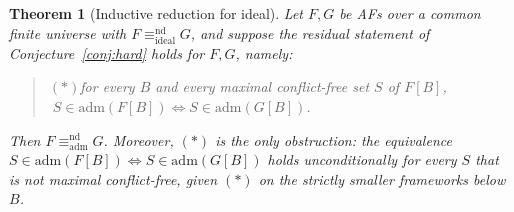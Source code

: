 \documentclass{amsart}
\newtheorem{theorem}{Theorem}
\theoremstyle{remark}
\begin{document}
\begin{theorem}[Inductive reduction for ideal]\label{thm:ideal-reduction}
Let $F,G$ be AFs over a common finite universe with
$F\equiv^{\mathrm{nd}}_{\mathrm{ideal}}G$, and suppose the residual statement of
Conjecture~\ref{conj:hard} holds for $F,G$, namely:
\begin{quote}
$(\ast)$\quad for every $B$ and every maximal conflict-free set $S$ of $F[B]$,
$\;S\in\mathrm{adm}(F[B])\iff S\in\mathrm{adm}(G[B])$.
\end{quote}
Then $F\equiv^{\mathrm{nd}}_{\mathrm{adm}}G$.  Moreover, $(\ast)$ is the
\emph{only} obstruction: the equivalence $S\in\mathrm{adm}(F[B])\iff
S\in\mathrm{adm}(G[B])$ holds unconditionally for every $S$ that is not maximal
conflict-free, given $(\ast)$ on the strictly smaller frameworks below $B$.
\end{theorem}
\end{document}
